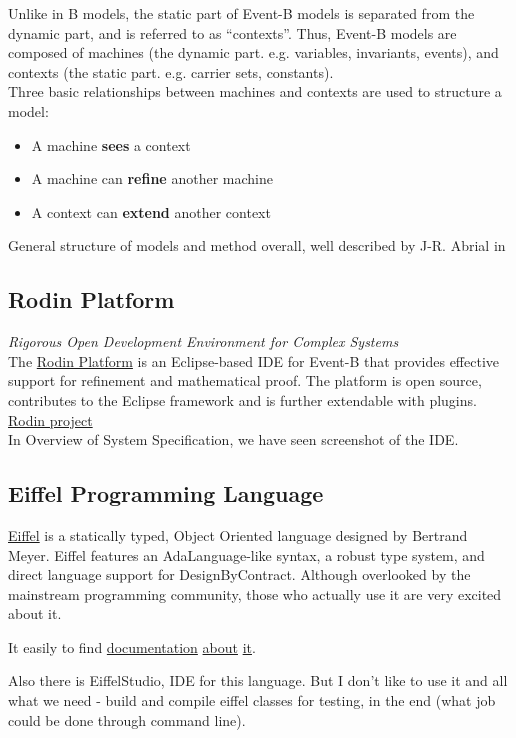 Unlike in B models, the static part of Event-B models is separated
from the dynamic part, and is referred to as ``contexts''. Thus, Event-B models
are composed of machines (the dynamic part. e.g. variables, invariants, events),
and contexts (the static part. e.g. carrier sets, constants).\\

Three basic relationships between machines and contexts are used to structure a
model:  

\begin{itemize}
  \item A machine \textbf{sees} a context
  \item A machine can \textbf{refine} another machine
  \item A context can \textbf{extend} another context
\end{itemize}

General structure of models and method overall, well described by J-R. Abrial in \cite{eventb}

\subsection{Rodin Platform}

\textit{Rigorous Open Development Environment for Complex Systems}\\

The
\href{http://wiki.event-b.org/}{Rodin Platform}
is an Eclipse-based IDE for Event-B that provides effective
support for refinement and mathematical proof. The platform is open source,
contributes to the Eclipse framework and is further extendable with plugins.\\

\href{http://rodin.cs.ncl.ac.uk/}{Rodin project}\\

In Overview of System Specification, we have seen screenshot of the IDE. 

\subsection{Eiffel Programming Language}

\href{http://wiki.c2.com/?EiffelLanguage}{Eiffel}
is a statically typed, Object Oriented language designed by
Bertrand Meyer. Eiffel features an AdaLanguage-like syntax, a robust type system,
and direct language support for DesignByContract. Although overlooked by the
mainstream programming community, those who actually use it are very excited
about it.  

It easily to find
\href{https://www.eiffel.org/doc/eiffel/Eiffel}{documentation}
\href{http://se.ethz.ch/~meyer/publications/online/eiffel/basic.html}{about}
\href{https://archive.eiffel.com/eiffel/nutshell.html}{it}.

Also there is EiffelStudio, IDE for this language. But I don't like to use it
and all what we need - build and compile eiffel classes for testing, in the end
(what job could be done through command line).